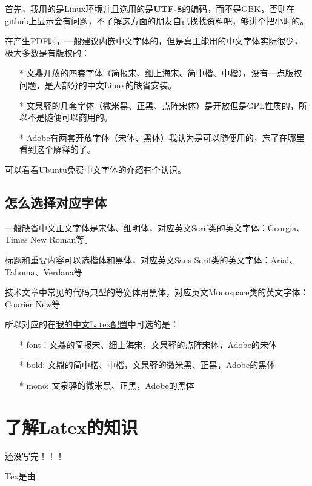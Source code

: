 \documentclass[a4paper]{book}
\newcommand{\chap}[1]{\newpage\thispagestyle{empty}\chapter{#1}\label{chap:\thechapter}}
\begin{document}
首先，我用的是Linux环境并且选用的是\textbf{UTF-8}的编码，而不是GBK，否则在github上显示会有问题，不了解这方面的朋友自己找找资料吧，够讲个把小时的。

在产生PDF时，一般建议内嵌中文字体的，但是真正能用的中文字体实际很少，极大多数是有版权的：

\begin{itemize}\setlength{\itemsep}{1pt}\setlength{\parskip}{0pt}\setlength{\parsep}{0pt}
\item[*]
  \href{http://www.arphic.com.tw/}{文鼎}开放的四套字体（简报宋、细上海宋、简中楷、中楷），没有一点版权问题，是大部分的中文Linux的缺省安装。
\item[*]
  \href{http://wenq.org/}{文泉驿}的几套字体（微米黑、正黑、点阵宋体）是开放但是GPL性质的，所以不是随便可以商用的。
\item[*]
  Adobe有两套开放字体（宋体、黑体）我认为是可以随便用的，忘了在哪里看到这个解释的了。
\end{itemize}
可以看看\href{http://wiki.ubuntu.org.cn/\%E5\%85\%8D\%E8\%B4\%B9\%E4\%B8\%AD\%E6\%96\%87\%E5\%AD\%97\%E4\%BD\%93}{Ubuntu免费中文字体}的介绍有个认识。

\section{怎么选择对应字体}

一般缺省中文正文字体是宋体、细明体，对应英文Serif类的英文字体：Georgia、Times New Roman等。

标题和重要内容可以选楷体和黑体，对应英文Sans Serif类的英文字体：Arial、Tahoma、Verdana等

技术文章中常见的代码典型的等宽体用黑体，对应英文Monospace类的英文字体：Courier New等

所以对应的在\href{https://github.com/larrycai/sdcamp/blob/master/latex/config.yml}{我的中文Latex配置}中可选的是：

\begin{itemize}\setlength{\itemsep}{1pt}\setlength{\parskip}{0pt}\setlength{\parsep}{0pt}
\item[*]
  font：文鼎的简报宋、细上海宋，文泉驿的点阵宋体，Adobe的宋体
\item[*]
  bold: 文鼎的简中楷、中楷，文泉驿的微米黑、正黑，Adobe的黑体
\item[*]
  mono: 文泉驿的微米黑、正黑，Adobe的黑体
\end{itemize}
\chap{了解Latex的知识}

还没写完！！！

Tex是由
\end{document}

